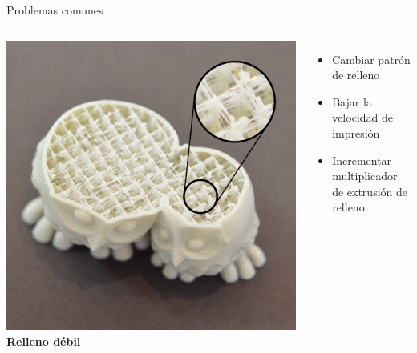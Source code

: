 \documentclass{beamer}
\begin{document}
	\begin{frame}{Problemas comunes}
		\begin{columns}
				\includegraphics[width=\textwidth]{images/Weak-Or-Stringy-Infill}
				\textbf{Relleno débil}
				\begin{itemize}
					\item Cambiar patrón de relleno
					\item Bajar la velocidad de impresión
					\item Incrementar multiplicador de extrusión de relleno
				\end{itemize}
		\end{columns}
	\end{frame}
\end{document}
